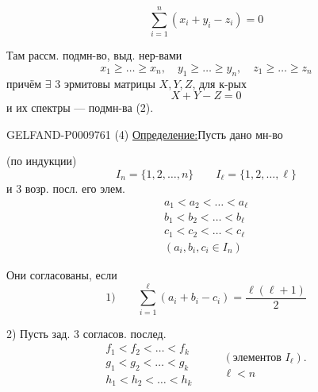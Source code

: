 \begin{equation*}
 \sum_{i=1}^n(x_i+y_i-z_i)=0
 \tag{1}
\end{equation*}

Там рассм. подмн-во, выд. нер-вами
\begin{equation*}
 x_1\geqslant\ldots\geqslant x_n,\quad
 y_1\geqslant\ldots\geqslant y_n,\quad
 z_1\geqslant\ldots\geqslant z_n
 \tag{2}
\end{equation*}
причём $\exists$ 3 эрмитовы матрицы $X,Y,Z$, для к-рых
\begin{equation*}
 X+Y-Z=0
 \tag{3}
\end{equation*}
и их спектры --- подмн-ва (2).

\begin{GelfandAdjacentEvidence}{GELFAND-P000976}{1}
(4) \underline{Определение:}\quad Пусть дано мн-во

(по индукции)
\[
 I_n=\{1,2,\ldots,n\}\qquad I_\ell=\{1,2,\ldots,\ell\}
\]
и 3 возр. посл. его элем.
\[
\begin{gathered}
 a_1<a_2<\ldots<a_\ell\\
 b_1<b_2<\ldots<b_\ell\\
 c_1<c_2<\ldots<c_\ell\\
 (a_i,b_i,c_i\in I_n)
\end{gathered}
\]

Они согласованы, если
\[
 1)\qquad \sum_{i=1}^{\ell}(a_i+b_i-c_i)=\frac{\ell(\ell+1)}2
\]

2) Пусть зад. 3 согласов. послед.
\[
\begin{gathered}
 f_1<f_2<\ldots<f_k\\
 g_1<g_2<\ldots<g_k\\
 h_1<h_2<\ldots<h_k
\end{gathered}
\qquad
\begin{gathered}
 (\text{элементов }I_\ell).\\
 \ell<n
\end{gathered}
\]
\end{GelfandAdjacentEvidence}
